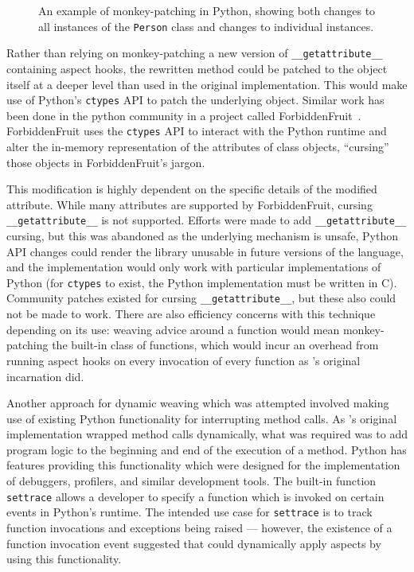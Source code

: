 \begin{figure}
    \centering
    
    \caption{An example of monkey-patching in Python, showing both changes to
    all instances of the \texttt{Person} class and changes to individual
    instances.}
    \label{fig:snippet-with-python-monkeypatching}
\end{figure}

Rather than relying on monkey-patching a new version of
\lstinline{__getattribute__} containing aspect hooks, the rewritten method could
be patched to the object itself at a deeper level than used in the original
\pdsf{} implementation. This would make use of Python's \lstinline{ctypes} API
to patch the underlying object. Similar work has been done in the python
community in a project called ForbiddenFruit~\cite{forbiddenfruit_repo}.
ForbiddenFruit uses the \lstinline{ctypes} API to interact with the Python
runtime and alter the in-memory representation of the attributes of class
objects, ``cursing'' those objects in ForbiddenFruit's jargon.

This modification is highly dependent on the specific details of the modified
attribute. While many attributes are supported by ForbiddenFruit, cursing
\lstinline{__getattribute__} is not supported. Efforts were made to add
\lstinline{__getattribute__} cursing, but this was abandoned as the underlying
mechanism is unsafe, Python API changes could render the library unusable in
future versions of the language, and the implementation would only work with
particular implementations of Python (for \lstinline{ctypes} to exist, the
Python implementation must be written in C). Community patches existed for
cursing \lstinline{__getattribute__}, but these also could not be made to work.
There are also efficiency concerns with this technique depending on its use:
weaving advice around a function would mean monkey-patching the built-in class
of functions, which would incur an overhead from running aspect hooks on every
invocation of every function as \pdsf{}'s original incarnation did.

Another approach for dynamic weaving which was attempted involved making use of
existing Python functionality for interrupting method calls. As \pdsf{}'s
original implementation wrapped method calls dynamically, what was required was
to add program logic to the beginning and end of the execution of a method.
Python has features providing this functionality which were designed for the
implementation of debuggers, profilers, and similar development tools.
The built-in function \lstinline{settrace} allows a developer to specify a function
which is invoked on certain events in Python's runtime. The intended use case
for \lstinline{settrace} is to track function invocations and exceptions being
raised --- however, the existence of a function invocation event suggested that \pdsf{}
could dynamically apply aspects by using this functionality.

